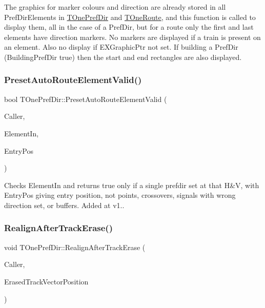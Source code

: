 The graphics for marker colours and direction are already stored in all Pref\+Dir\+Elements in \mbox{\hyperlink{class_t_one_pref_dir}{T\+One\+Pref\+Dir}} and \mbox{\hyperlink{class_t_one_route}{T\+One\+Route}}, and this function is called to display them, all in the case of a Pref\+Dir, but for a route only the first and last elements have direction markers. No markers are displayed if a train is present on an element. Also no display if E\+X\+Graphic\+Ptr not set. If building a Pref\+Dir (Building\+Pref\+Dir true) then the start and end rectangles are also displayed. \mbox{\label{class_t_one_pref_dir_ab35c683ba0ec156d19d4db991046b7d2}} 
\subsubsection{\texorpdfstring{Preset\+Auto\+Route\+Element\+Valid()}{PresetAutoRouteElementValid()}}
{\footnotesize\ttfamily bool T\+One\+Pref\+Dir\+::\+Preset\+Auto\+Route\+Element\+Valid (\begin{DoxyParamCaption}\item[{int}]{Caller,  }\item[{\mbox{\hyperlink{class_t_pref_dir_element}{T\+Pref\+Dir\+Element}}}]{Element\+In,  }\item[{int}]{Entry\+Pos }\end{DoxyParamCaption})\hspace{0.3cm}{\ttfamily [protected]}}

Checks Element\+In and returns true only if a single prefdir set at that H\&V, with Entry\+Pos giving entry position, not points, crossovers, signals with wrong direction set, or buffers. Added at v1.. \mbox{\label{class_t_one_pref_dir_ab5bb3791670fd04645faf4ab1f2a5781}} 
\subsubsection{\texorpdfstring{Realign\+After\+Track\+Erase()}{RealignAfterTrackErase()}}
{\footnotesize\ttfamily void T\+One\+Pref\+Dir\+::\+Realign\+After\+Track\+Erase (\begin{DoxyParamCaption}\item[{int}]{Caller,  }\item[{int}]{Erased\+Track\+Vector\+Position }\end{DoxyParamCaption})}

